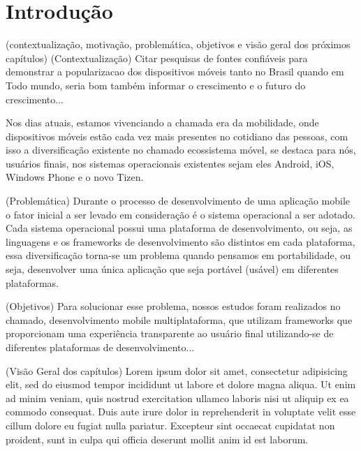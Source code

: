 \chapter{Introdução} %
(contextualização, motivação, problemática, objetivos e visão geral dos próximos
capítulos)
(Contextualização) Citar pesquisas de fontes confiáveis para demonstrar a
popularizacao dos dispositivos móveis tanto no Brasil quando em Todo mundo,
seria bom também informar o crescimento e o futuro do crescimento...

Nos dias atuais, estamos vivenciando a chamada era da mobilidade, onde dispositivos
móveis estão cada vez mais presentes no cotidiano das pessoas, com isso a
diversificação existente no chamado ecossistema móvel, se destaca para nós,
usuários finais, nos sistemas operacionais existentes sejam eles Android, iOS,
Windows Phone e o novo Tizen.

(Problemática) Durante o processo de desenvolvimento de uma aplicação mobile o
fator inicial a ser levado em consideração é o sistema operacional a ser adotado.
Cada sistema operacional possui uma plataforma de desenvolvimento, ou seja, as
linguagens e os frameworks de desenvolvimento são distintos em cada plataforma,
essa diversificação torna-se um problema quando pensamos em portabilidade,
ou seja, desenvolver uma única aplicação que seja portável (usável) em
diferentes plataformas.

(Objetivos) Para solucionar esse problema, nossos estudos foram realizados no
chamado, desenvolvimento mobile multiplataforma, que utilizam frameworks que
proporcionam uma experiência transparente ao usuário final utilizando-se de
diferentes plataformas de desenvolvimento...

(Visão Geral dos capítulos)
Lorem ipsum dolor sit amet, consectetur adipisicing elit, sed do eiusmod
tempor incididunt ut labore et dolore magna aliqua. Ut enim ad minim veniam,
quis nostrud exercitation ullamco laboris nisi ut aliquip ex ea commodo
consequat. Duis aute irure dolor in reprehenderit in voluptate velit esse
cillum dolore eu fugiat nulla pariatur. Excepteur sint occaecat cupidatat non
proident, sunt in culpa qui officia deserunt mollit anim id est laborum.

